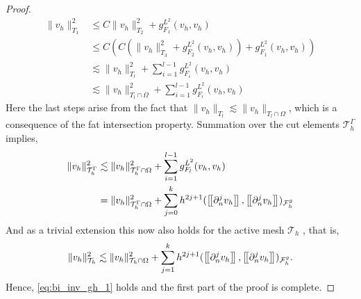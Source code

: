 \begin{proof}
    \begin{align}
            \| v_{h} \|_{ T_{1} }^{2  }  & \le  C \| v_{h} \|_{ T_{2} }^{ 2 } + g_{F_{1}}^{L^{2}}( v_{h},v_{h})\\
              & \le  C( C( \| v_{h} \|_{ T_{3} }^{ 2 } + g_{F_{2}}^{L^{2}}( v_{h},v_{h}) ) + g_{F_{1}}^{L^{2}}( v_{h},v_{h}) )\\
              & \lesssim    \| v_{h} \|_{ T_{l} }^{ 2 }  + \sum_{i=1}^{l-1} g_{F_{i}}^{L^{2}}( v_{h},v_{h})  \\
              & \lesssim    \| v_{h} \|_{ T_{l} \cap \Omega  }^{ 2 }  + \sum_{i=1}^{l-1} g_{F_{i}}^{L^{2}}( v_{h},v_{h})
    \end{align}
            Here the last steps arise from the fact that $\|  v_{h} \|_{ T_{l} }^{  } \lesssim  \|  v_{h} \|_{ T_{l} \cap \Omega  }^{  }  $, which is a consequence of the fat intersection property.
            Summation over the cut elements $\mathcal{T} ^{\Gamma }_{h}$ implies,
            \begin{align}
                    \| v_{h} \|_{ \mathcal{T} ^{\Gamma }_h }^{2  } & \lesssim \| v_{h} \|_{ \mathcal{T} ^{\Gamma }_h\cap \Omega  }^{2  }+ \sum_{i=1}^{l-1} g_{F_{l}}^{L^{2}}( v_{h},v_{h}) \\
                                                                 & = \| v_{h} \|_{ \mathcal{T}^{\Gamma }_h \cap \Omega   }^{ 2 }  + \sum_{j=0}^{k} h^{2j+1} ( \left[\!\left[  \partial ^{j}_{n} v_{h}  \right]\!\right], \left[\!\left[  \partial ^{j}_{n}v_{h}  \right]\!\right]    )_{\mathcal{F}_{h}^{g}}
            \end{align}
        And as a trivial extension this now also holds for the active mesh $\mathcal{T} _{h}$ , that is,
        \begin{equation}
                    \| v_{h} \|_{ \mathcal{T} _{h } }^{2  } \lesssim  \| v_{h} \|_{ \mathcal{T}_{h } \cap \Omega   }^{ 2 }  + \sum_{j=1}^{k} h^{2j+1} ( \left[\!\left[  \partial ^{j}_{n} v_{h}  \right]\!\right], \left[\!\left[  \partial ^{j}_{n}v_{h}  \right]\!\right]    )_{\mathcal{F}_{h}^{g}}.
        \end{equation}
        Hence, \eqref{eq:bi_inv_gh_1} holds and the first part of the proof is complete.


\end{proof}

